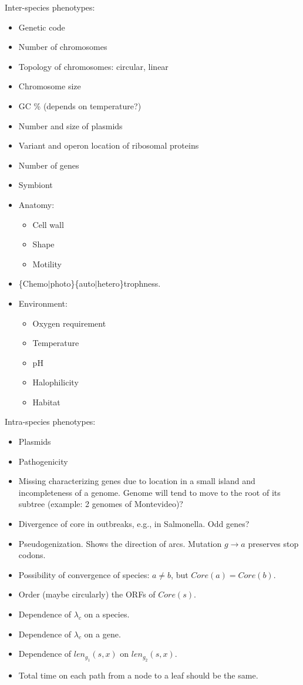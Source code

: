\documentclass[10pt,a4paper]{article}
\theoremstyle{plain} \newtheorem{Lem}{Lemma}
\begin{document}
Inter-species phenotypes:
\begin{itemize}
	\item Genetic code
	\item Number of chromosomes
	\item Topology of chromosomes: circular, linear
	\item Chromosome size
	\item GC \% (depends on temperature?)
	\item Number and size of plasmids
	\item Variant and operon location of ribosomal proteins
	\item Number of genes
	\item Symbiont
	\item Anatomy:
	\begin{itemize}
		\item Cell wall
		\item Shape
		\item Motility
	\end{itemize}
	\item \{Chemo$|$photo\}\{auto$|$hetero\}trophness.
    \item Environment:
	\begin{itemize}
		\item Oxygen requirement
		\item Temperature 
		\item pH 
		\item Halophilicity
		\item Habitat
	\end{itemize}
\end{itemize}


Intra-species phenotypes:
\begin{itemize}
  \item Plasmids
  \item Pathogenicity
\end{itemize}


\Questions
\begin{itemize}
\item Missing characterizing genes due to location in a small island and incompleteness of a genome. 
      Genome will tend to move to the root of its subtree (example: 2 genomes of Montevideo)?
\item Divergence of core in outbreaks, e.g., in Salmonella. Odd genes?
\item Pseudogenization. Shows the direction of arcs. Mutation $g \to a$ preserves stop codons.
\item Possibility of convergence of species: $a \ne b$, but $Core(a) = Core(b)$.
\item Order (maybe circularly) the ORFs of $Core(s)$.
\item Dependence of $\lambda_c$ on a species.
\item Dependence of $\lambda_c$ on a gene.
\item Dependence of $len_{g_1}(s,x)$ on $len_{g_2}(s,x)$.
\item Total time on each path from a node to a leaf should be the same.
\end{itemize}
\end{document}
